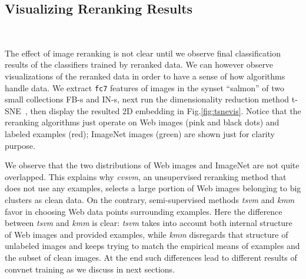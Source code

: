 \documentclass[preprint,12pt]{elsarticle}
\begin{document}
\subsection{Visualizing Reranking Results}\label{sec:vizrerank}
\begin{figure*}[!th]
\centering
{}\hspace{0.4cm}
 \\
\caption{The behaviors of three reranking techniques(a)  \emph{cvsvm}, (b) \emph{kmm}, and (c) \emph{tsvm} on the synset \emph{salmon}. Red and green dots denote ImageNet images while black and pink dots denote FlickrBing images. Shown in green dots are clean images drawn from ImageNet, red dots denote examples given to the reranking algorithms, black dots denote noises determined by algorithms, and pink dots denote clean images determined by algorithms.}
\label{fig:tsnevis}
\end{figure*}
\noindent The effect of image reranking is not clear until we observe final classification results of the classifiers trained by reranked data. We can however observe  visualizations of the reranked data in order to have a sense of how algorithms handle data. We extract \texttt{fc7} features of images in the synset ``salmon'' of two small collections FB-s and IN-s, next run the dimensionality reduction method t-SNE~\cite{van2008visualizing}, then display the resulted 2D embedding in Fig.\ref{fig:tsnevis}. Notice that the reranking algorithms just operate on Web images (pink and black dots) and labeled examples (red); ImageNet images (green) are shown just for clarity purpose. 

We observe that the two distributions of Web images and ImageNet are not quite overlapped. This explains why \emph{cvsvm}, an unsupervised reranking method that does not use any examples, selects a large portion of Web images belonging to big clusters as clean data. On the contrary, semi-supervised methods \emph{tsvm} and \emph{kmm} favor in choosing Web data points surrounding examples. Here the difference between \emph{tsvm} and \emph{kmm} is clear: \emph{tsvm} takes into account both internal structure of Web images and provided examples, while \emph{kmm} disregards that structure of unlabeled images and keeps trying to match the empirical means of examples and the subset of clean images. At the end such  differences lead to different results of convnet training as we discuss in next sections.
\end{document}
